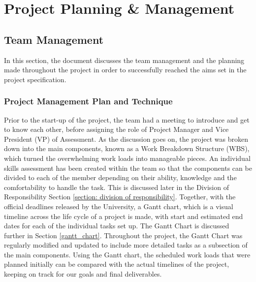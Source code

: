 
\chapter{Project Planning \& Management} \label{Chapter:Project Planning & Management}


\section{Team Management}
In this section, the document discusses the team management and the planning made throughout the project in order to successfully reached the aims set in the project specification.

\subsection{Project Management Plan and Technique}
Prior to the start-up of the project, the team had a meeting to introduce and get to know each other, before assigning the role of Project Manager and Vice President (VP) of Assessment. As the discussion goes on, the project was broken down into the main components, known as a Work Breakdown Structure (WBS), which turned the overwhelming work loads into manageable pieces. An individual skills assessment has been created within the team so that the components can be divided to each of the member depending on their ability, knowledge and the comfortability to handle the task. This is discussed later in the Division of Responsibility Section \ref{section: division of responsibility}. Together, with the official deadlines released by the University, a Gantt chart, which is a visual timeline across the life cycle of a project is made, with start and estimated end dates for each of the individual tasks set up. The Gantt Chart is discussed further in Section \ref{gantt_chart}. Throughout the project, the Gantt Chart was regularly modified and updated to include more detailed tasks as a subsection of the main components. Using the Gantt chart, the scheduled work loads that were planned initially can be compared with the actual timelines of the project, keeping on track for our goals and final deliverables.
                                                                  
